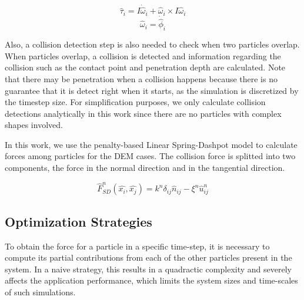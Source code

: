 \documentclass[preprint,12pt]{elsarticle}
\begin{document}
\begin{equation}
    \hat{\tau}{_i} = I \dot{\hat \omega}_i + {\hat \omega}_i \times I {\hat \omega}_i \label{eq:newton_torque}
\end{equation}
\begin{equation}
    \hat{\omega}{_i} = \dot{\hat{\phi}}_i \label{eq:newton_angular_velocity}
\end{equation}

Also, a collision detection step is also needed to check when two particles overlap.
When particles overlap, a collision is detected and information regarding the collision such as the contact point and penetration depth are calculated.
Note that there may be penetration when a collision happens because there is no guarantee that it is detect right when it starts, as the simulation is discretized by the timestep size.
For simplification purposes, we only calculate collision detections analytically in this work since there are no particles with complex shapes involved.

In this work, we use the penalty-based Linear Spring-Dashpot model to calculate forces among particles for the DEM cases.
The collision force is splitted into two components, the force in the normal direction and in the tangential direction.

\begin{equation}
	\hat{F}_{SD}^{n}(\hat{x_i}, \hat{x_j}) = k^{n}\delta_{ij}\hat{n}_{ij} - \xi^{n}\hat{u}_{ij}^{n}
    \label{eq:linear_spring_dashpot_normal}
\end{equation}


\subsection{Optimization Strategies}
\label{sec:opts}

To obtain the force for a particle in a specific time-step, it is necessary to compute its partial contributions from each of the other particles present in the system.
In a naive strategy, this results in a quadractic complexity and severely affects the application performance, which limits the system sizes and time-scales of such simulations.
\end{document}
